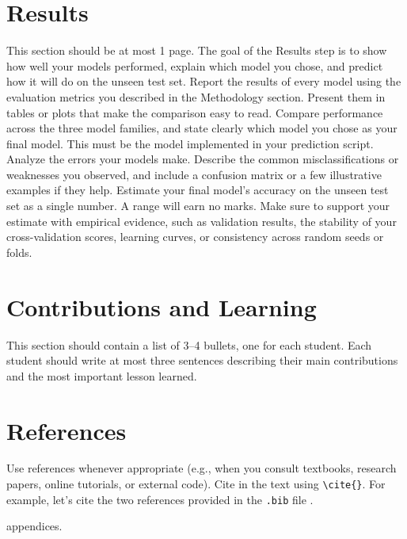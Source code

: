 \documentclass[12pt]{article}
\begin{document}
\section{Results}\label{sec:results}
This section should be at most 1 page.
The goal of the Results step is to show how well your models performed, explain
which model you chose, and predict how it will do on the unseen test set.
Report the results of every model using the evaluation metrics you described in the
Methodology section. Present them in tables or plots that make the comparison easy
to read.
Compare performance across the three model families, and state clearly which model
you chose as your final model. This must be the model implemented in your
prediction script.
Analyze the errors your models make. Describe the common misclassifications or
weaknesses you observed, and include a confusion matrix or a few illustrative
examples if they help.
Estimate your final model's accuracy on the unseen test set as a single number. A
range will earn no marks. Make sure to support your estimate with empirical
evidence, such as validation results, the stability of your cross-validation
scores, learning curves, or consistency across random seeds or folds.
\section{Contributions and Learning}
This section should contain a list of 3–4 bullets, one for each student. Each
student should write at most three sentences describing their main contributions
and the most important lesson learned.
\section{References}
Use references whenever appropriate (e.g., when you consult textbooks, research
papers, online tutorials, or external code). Cite in the text using \verb|\cite{}|.
For example, let's cite the two references provided in the \texttt{.bib} file
\cite{bishop2006prml,hastie2009esl}.


\newpage
\appendix
appendices.
\end{document}
